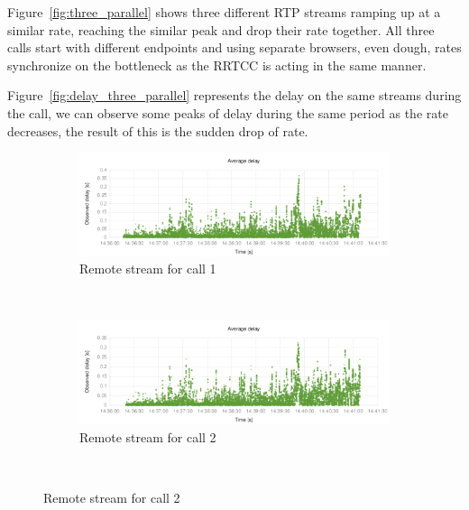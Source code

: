 Figure~\ref{fig:three_parallel} shows three different RTP streams ramping up at a similar rate, reaching the similar peak and drop their rate together. All three calls start with different endpoints and using separate browsers, even dough, rates synchronize on the bottleneck as the RRTCC is acting in the same manner.

Figure~\ref{fig:delay_three_parallel} represents the delay on the same streams during the call, we can observe some peaks of delay during the same period as the rate decreases, the result of this is the sudden drop of rate.

\begin{figure}[h]
        \centering
        \begin{subfigure}[b]{0.5\textwidth}
                \centering
                \includegraphics[width=\textwidth]{./figures/delay_three_parallel_1.pdf}
                \caption{Remote stream for call 1}
                \label{fig:three_parallel_1}
        \end{subfigure}%
        ~ %
        \begin{subfigure}[b]{0.5\textwidth}
                \centering
                \includegraphics[width=\textwidth]{./figures/delay_three_parallel_2.pdf}
                \caption{Remote stream for call 2}
                \label{fig:three_parallel_2}
        \end{subfigure}        
        ~ %

\end{figure}
